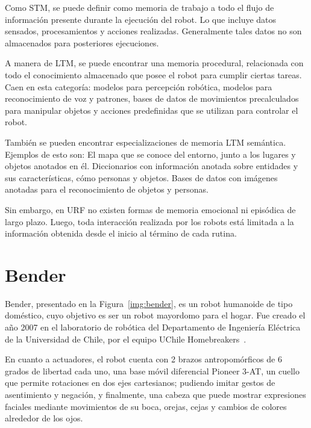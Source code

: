 Como STM, se puede definir como memoria de trabajo a todo el flujo de información presente durante la ejecución del robot. Lo que incluye datos sensados, procesamientos y acciones realizadas. Generalmente tales datos no son almacenados para posteriores ejecuciones.

A manera de LTM, se puede encontrar una memoria procedural, relacionada con todo el conocimiento almacenado que posee el robot para cumplir ciertas tareas. Caen en esta categoría: modelos para percepción robótica, modelos para reconocimiento de voz y patrones, bases de datos de movimientos precalculados para manipular objetos y acciones predefinidas que se utilizan para controlar el robot.

También se pueden encontrar especializaciones de memoria LTM semántica. Ejemplos de esto son: El mapa que se conoce del entorno, junto a los lugares y objetos anotados en él. Diccionarios con información anotada sobre entidades y sus características, cómo personas y objetos. Bases de datos con imágenes anotadas para el reconocimiento de objetos y personas. 

Sin embargo, en URF no existen formas de memoria emocional ni episódica de largo plazo. Luego, toda interacción realizada por los robots está limitada a la información obtenida desde el inicio al término de cada rutina.


\section{Bender}

Bender, presentado en la Figura~\ref{img:bender}, es un robot humanoide de tipo doméstico, cuyo objetivo es ser un robot mayordomo para el hogar. Fue creado el año 2007 en el laboratorio de robótica del Departamento de Ingeniería Eléctrica de la Universidad de Chile, por el equipo UChile Homebreakers~\cite{uchile-robotics}.

En cuanto a actuadores, el robot cuenta con 2 brazos antropomórficos de 6 grados de libertad cada uno, una base móvil diferencial Pioneer 3-AT, un cuello que permite rotaciones en dos ejes cartesianos; pudiendo imitar gestos de asentimiento y negación, y finalmente, una cabeza que puede mostrar expresiones faciales mediante movimientos de su boca, orejas, cejas y cambios de colores alrededor de los ojos.

